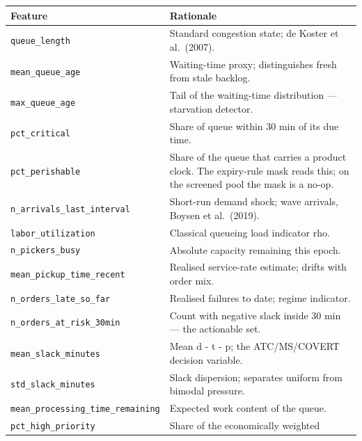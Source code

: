 \documentclass[review,3p,times]{elsarticle}
\newcounter{none}
\theoremstyle{definition}
\begin{document}
{\def\LTcaptype{none} %
\begin{longtable}[]{@{}
  >{\raggedright\arraybackslash}p{}
  >{\raggedright\arraybackslash}p{}@{}}
\toprule\noalign{}
\begin{minipage}[b]{\linewidth}\raggedright
Feature
\end{minipage} & \begin{minipage}[b]{\linewidth}\raggedright
Rationale
\end{minipage} \\
\midrule\noalign{}
\endhead
\bottomrule\noalign{}
\endlastfoot
\texttt{queue\_length} & Standard congestion state; de Koster et
al.~(2007). \\
\texttt{mean\_queue\_age} & Waiting-time proxy; distinguishes fresh from
stale backlog. \\
\texttt{max\_queue\_age} & Tail of the waiting-time distribution ---
starvation detector. \\
\texttt{pct\_critical} & Share of queue within 30 min of its due
time. \\
\texttt{pct\_perishable} & Share of the queue that carries a product
clock. The expiry-rule mask reads this; on the screened pool the mask is
a no-op. \\
\texttt{n\_arrivals\_last\_interval} & Short-run demand shock; wave
arrivals, Boysen et al.~(2019). \\
\texttt{labor\_utilization} & Classical queueing load indicator rho. \\
\texttt{n\_pickers\_busy} & Absolute capacity remaining this epoch. \\
\texttt{mean\_pickup\_time\_recent} & Realised service-rate estimate;
drifts with order mix. \\
\texttt{n\_orders\_late\_so\_far} & Realised failures to date; regime
indicator. \\
\texttt{n\_orders\_at\_risk\_30min} & Count with negative slack inside
30 min --- the actionable set. \\
\texttt{mean\_slack\_minutes} & Mean d - t - p; the ATC/MS/COVERT
decision variable. \\
\texttt{std\_slack\_minutes} & Slack dispersion; separates uniform from
bimodal pressure. \\
\texttt{mean\_processing\_time\_remaining} & Expected work content of
the queue. \\
\texttt{pct\_high\_priority} & Share of the economically weighted

\end{longtable}}
\end{document}
